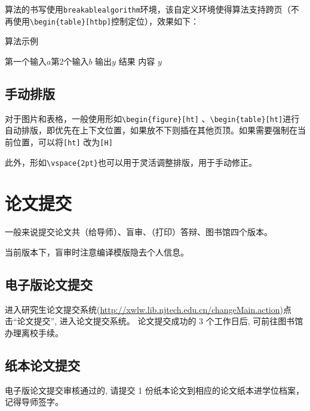 \documentclass[smd,entitle,forlib,AutoFakeBold]{NJTECHMaster}
\begin{document}
算法的书写使用\verb|breakablealgorithm|环境，该自定义环境使得算法支持跨页（不再使用\verb|\begin{table}[htbp]|控制定位），效果如下：
\begin{breakablealgorithm}%
	\caption{ 算法示例} 
	\label{alg:flow-table-del} 
		\begin{algorithmic}[1] %
			\Require 第一个输入$a$\newline 第2个输入$b$  %
			\Ensure 输出$y$	%
			\State 结果
			\Else
			\State 内容
			\EndWhile
			\EndIf
			\State \Return $y$%
		\end{algorithmic}
\end{breakablealgorithm}

\section{手动排版}

对于图片和表格，一般使用形如\verb|\begin{figure}[ht]| 、\verb|\begin{table}[ht]|进行自动排版，即优先在上下文位置，如果放不下则插在其他页顶。如果需要强制在当前位置，可以将\verb|[ht]| 改为\verb|[H]| 
		
此外，形如\verb|\vspace{2pt}|也可以用于灵活调整排版，用于手动修正。

\chapter{论文提交}

一般来说提交论文共（给导师）、盲审、（打印）答辩、图书馆四个版本。

当前版本下，盲审时注意编译模版隐去个人信息。


\section*{电子版论文提交}

进入研究生论文提交系统(\url{http://xwlw.lib.njtech.edu.cn/changeMain.action})点击``论文提交'', 进入论文提交系统。
论文提交成功的 3 个工作日后, 可前往图书馆办理离校手续。


\section*{纸本论文提交}

电子版论文提交审核通过的, 请提交 1 份纸本论文到相应的论文纸本进学位档案，记得导师签字。

{}


\ifprint
\cleardoublepage 
\fi

\normalsize%
\backmatter
\end{document}

